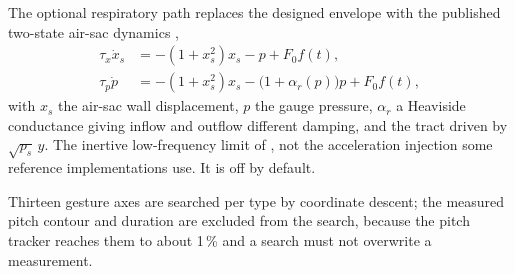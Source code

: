 \documentclass[10pt,twocolumn,a4paper]{article}
\begin{document}
The optional respiratory path replaces the designed envelope with the published two-state
air-sac dynamics \citep{fainstein2025},
\begin{align}
\tau_x \dot{x}_s &= -(1 + x_s^{2})x_s - p + F_0 f(t), \\
\tau_p \dot{p}   &= -(1 + x_s^{2})x_s - \bigl(1 + \alpha_r(p)\bigr)p + F_0 f(t),
\end{align}
with $x_s$ the air-sac wall displacement, $p$ the gauge pressure, $\alpha_r$ a Heaviside
conductance giving inflow and outflow different damping, and the tract driven by
$\sqrt{p_s}\,y$. The inertive low-frequency limit of \citet{laje2005}, not the acceleration
injection some reference implementations use. It is off by default.

Thirteen gesture axes are searched per type by coordinate descent; the measured pitch contour
and duration are excluded from the search, because the pitch tracker reaches them to about
1\,\% and a search must not overwrite a measurement.
\end{document}
